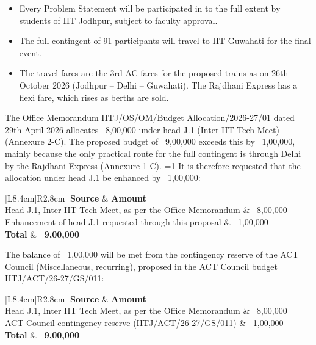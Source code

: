\documentclass[11pt,letterpaper]{article}
\newcommand{\rs}{{\rupee}}
\providecommand{\increasevariant}{0}
\newcommand{\ifincrease}[2]{\ifnum\increasevariant=1 #1\else #2\fi}
\newcommand{\subhead}[1]{\par\needspace{6\baselineskip}{\bfseries #1}\par\nopagebreak}
\begin{document}
\begin{itemize}
  \item Every Problem Statement will be participated in to the full extent by students of IIT Jodhpur, subject to faculty approval.
  \item The full contingent of 91 participants will travel to IIT Guwahati for the final event.
  \item The travel fares are the 3rd AC fares for the proposed trains as on 26th October 2026 (Jodhpur -- Delhi -- Guwahati). The Rajdhani Express has a flexi fare, which rises as berths are sold.
\end{itemize}

\subhead{Funding of the budget}
The Office Memorandum IITJ/OS/OM/Budget Allocation/2026-27/01 dated 29th April 2026 allocates \rs~8,00,000 under head J.1 (Inter IIT Tech Meet) (Annexure 2-C). The proposed budget of \rs~9,00,000 exceeds this by \rs~1,00,000, mainly because the only practical route for the full contingent is through Delhi by the Rajdhani Express (Annexure 1-C).
\ifincrease{%
It is therefore requested that the allocation under head J.1 be enhanced by \rs~1,00,000:

\begin{center}
\begin{tabular}{|L{8.4cm}|R{2.8cm}|}
\hline
\textbf{Source} & \textbf{Amount} \\ \hline
Head J.1, Inter IIT Tech Meet, as per the Office Memorandum & \rs~8,00,000 \\ \hline
Enhancement of head J.1 requested through this proposal & \rs~1,00,000 \\ \hline
\textbf{Total} & \textbf{\rs~9,00,000} \\ \hline
\end{tabular}
\end{center}}{%
The balance of \rs~1,00,000 will be met from the contingency reserve of the ACT Council (Miscellaneous, recurring), proposed in the ACT Council budget IITJ/ACT/26-27/GS/011:

\begin{center}
\begin{tabular}{|L{8.4cm}|R{2.8cm}|}
\hline
\textbf{Source} & \textbf{Amount} \\ \hline
Head J.1, Inter IIT Tech Meet, as per the Office Memorandum & \rs~8,00,000 \\ \hline
ACT Council contingency reserve (IITJ/ACT/26-27/GS/011) & \rs~1,00,000 \\ \hline
\textbf{Total} & \textbf{\rs~9,00,000} \\ \hline
\end{tabular}
\end{center}}
\end{document}
